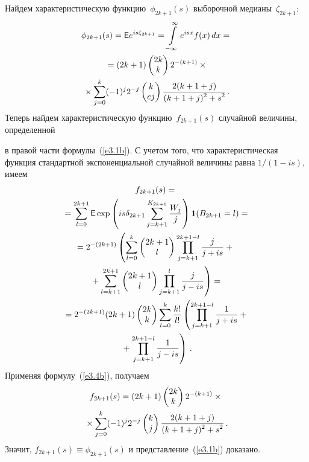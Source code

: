 \begin{multicols}{2}
Найдем характеристическую функцию~$\phi_{2k+1}(s)$ выборочной
медианы~$\zeta_{2k+1}$:
\begin{multline*}
\phi_{2k+1}(s)={\sf E} e^{is\zeta_{2k+1}}=
\int\limits_{-\infty}^{\infty}e^{isx}f(x)\,dx={}\\
{}=
(2k+1)
\begin{pmatrix}
2k\\  k\end{pmatrix}
2^{-(k+1)}\times{}\\
{}\times
\sum\limits_{j=0}^k (-1)^j 2^{-j}
\begin{pmatrix}
k\\ e j\end{pmatrix}
\displaystyle\frac{\displaystyle 2(k+1+j)\mathstrut}{\displaystyle (k+1+j)^2+s^2\mathstrut}\,.
\end{multline*}
Теперь найдем характеристическую функцию~$f_{2k+1}(s)$ случайной величины, определенной\linebreak\vspace*{-12pt}\pagebreak

\noindent
в правой части  формулы~(\ref{e3.1b}).
С учетом того, что
 характеристическая функция стандартной экспоненциальной
случайной величины равна $1/(1-is)$, имеем
\begin{multline*}
f_{2k+1}(s)={}\\
{}=
\sum\limits_{l=0}^{2k+1}{\sf E} \exp \left(is\delta_{2k+1}
\sum\limits_{j=k+1}^{K_{2k+1}}\displaystyle\frac{\displaystyle W_j\mathstrut}{\displaystyle j\mathstrut}\right)\mathbf{1}(B_{2k+1}=l)={}
\\
=2^{-(2k+1)}\left(\sum\limits_{l=0}^k \begin{pmatrix}
2k+1\\  l\end{pmatrix}
\prod\limits_{j=k+1}^{2k+1-l}\displaystyle\frac{\displaystyle j\mathstrut}{\displaystyle j+is\mathstrut}+{}\right.\\
\left.{}+
\sum\limits_{l=k+1}^{2k+1}
\begin{pmatrix}
2k+1\\ l\end{pmatrix}
\prod\limits_{j=k+1}^{l}\displaystyle\frac{\displaystyle j\mathstrut}{\displaystyle j-is\mathstrut}
\right)={}\\
{}
=2^{-(2k+1)}(2k+1)
\begin{pmatrix}
2k\\ k\end{pmatrix}
\sum\limits_{l=0}^k\displaystyle\frac{\displaystyle k!\mathstrut}{\displaystyle l!\mathstrut}
\left(\prod\limits_{j=k+1}^{2k+1-l}\displaystyle\frac{\displaystyle 1\mathstrut}{\displaystyle j+is\mathstrut} +{}\right.\\
\left.{}+
\prod\limits_{j=k+1}^{2k+1-l}\displaystyle\frac{\displaystyle 1\mathstrut}{\displaystyle j-is\mathstrut}\right)\,.
\end{multline*}
Применяя формулу~(\ref{e3.4b}), получаем
\begin{multline*}
f_{2k+1}(s)=(2k+1)
\begin{pmatrix}
2k\\  k
\end{pmatrix}
2^{-(k+1)}\times{}\\
{}\times
\sum\limits_{j=0}^k(-1)^j 2^{-j}
\begin{pmatrix}
k\\  j\end{pmatrix}
\displaystyle\frac{\displaystyle 2(k+1+j)\mathstrut}{\displaystyle (k+1+j)^2+s^2\mathstrut}\,.
\end{multline*}
Значит, $f_{2k+1}(s)\equiv\phi_{2k+1}(s)$ и представление~(\ref{e3.1b}) доказано.
\medskip


\end{multicols}
